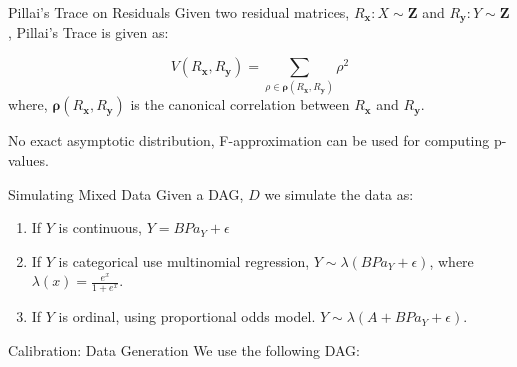 \documentclass{beamer}
\begin{document}
\begin{frame}{Pillai's Trace on Residuals}
Given two residual matrices, $ R_{\bm{x}}: X \sim \bm{Z} $ and $ R_{\bm{y}}: Y \sim \bm{Z} $, Pillai's Trace is given as:

\begin{equation}
	\textit{V}(R_\mathbf{x}, R_\mathbf{y}) = \sum_{\rho \in \bm{\rho}(R_\mathbf{x}, R_\mathbf{y})} \rho^2
\end{equation}
where, $ \bm{\rho}({R_\mathbf{x}, R_\mathbf{y}}) $  is the canonical correlation between $ R_\mathbf{x} $ and $ R_\mathbf{y} $.

\vspace{1em}

No exact asymptotic distribution, F-approximation can be used for computing p-values.

\end{frame}

\begin{frame}{Simulating Mixed Data}
	Given a DAG, $ D $ we simulate the data as:
	\begin{enumerate}
		\item If $ Y $ is continuous, $ Y = B Pa_Y + \epsilon $
		\item If $ Y $ is categorical use multinomial regression, $ Y \sim \lambda(B Pa_Y + \epsilon) $, where $ \lambda(x) = \frac{e^x}{1+e^x} $.
		\item If $ Y $ is ordinal, using proportional odds model. $ Y \sim \lambda(A + B Pa_Y + \epsilon) $.
	\end{enumerate}
\end{frame}

\begin{frame}{Calibration: Data Generation}
	We use the following DAG:
\begin{center}
\end{center}

\end{frame}
\end{document}
